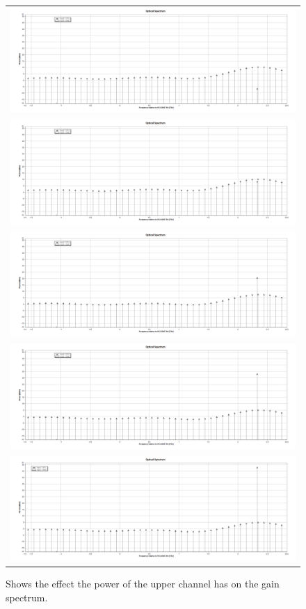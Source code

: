 \begin{figure}
    \caption{Shows the effect the power of the upper channel has on the gain spectrum.}
    \centering
    \begin{tabular}{c}
        \includegraphics[width=0.85\linewidth]{images/technical_work/section_1_characterisation/steps/2.png} \\
        \includegraphics[width=0.85\linewidth]{images/technical_work/section_1_characterisation/steps/4.png} \\
        \includegraphics[width=0.85\linewidth]{images/technical_work/section_1_characterisation/steps/6.png} \\
        \includegraphics[width=0.85\linewidth]{images/technical_work/section_1_characterisation/steps/8.png} \\
        \includegraphics[width=0.85\linewidth]{images/technical_work/section_1_characterisation/steps/10.png} \\ 
    \end{tabular}
    \label{fig:tw_amp_char_uc}
\end{figure}

